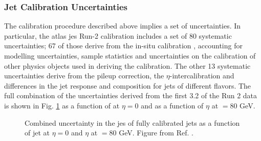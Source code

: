 \subsubsection{Jet Calibration Uncertainties}

The calibration procedure described above implies a set of uncertainties. In particular, 
the \gls{atlas} \gls{jes} Run-2 calibration includes a set of 80 systematic uncertainties; 
67 of those derive from the in-situ calibration \cite{PhysRevD.96.072002}, accounting for modelling uncertainties, 
sample statistics and uncertainties on the calibration of other physics objects used in deriving the calibration. 
The other 13 systematic uncertainties derive from the pileup correction, the $\eta$-intercalibration 
and differences in the jet response and composition for jets of different flavors. 
The full combination of the uncertainties derived from the first 3.2 \ifb of the Run 2 data 
is shown in Fig. \ref{fig:obj:jessyst} as a function of \pt at $\eta = 0$ and as a function of $\eta$ at \pt$ = 80$ GeV.

\begin{figure}[h]
\begin{center}
\end{center}
 \caption{Combined uncertainty in the \gls{jes} of fully calibrated jets as a function of   
 jet \pt at $\eta = 0$ and  $\eta$ at \pt$ = 80$ GeV. Figure from Ref. \cite{PhysRevD.96.072002}.}
  \label{fig:obj:jessyst}
\end{figure}

